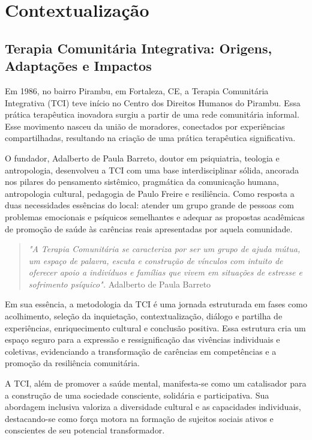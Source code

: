 \part{Contextualização}

    \chapter{Terapia Comunitária Integrativa: Origens, Adaptações e Impactos}
        Em 1986, no bairro Pirambu, em Fortaleza, CE, a Terapia Comunitária Integrativa (TCI) teve início no Centro dos Direitos Humanos do Pirambu. Essa prática terapêutica inovadora surgiu a partir de uma rede comunitária informal. Esse movimento nasceu da união de moradores, conectados por experiências compartilhadas, resultando na criação de uma prática terapêutica significativa. 
        
        O fundador, Adalberto de Paula Barreto, doutor em psiquiatria, teologia e antropologia, desenvolveu a TCI com uma base interdisciplinar sólida, ancorada nos pilares do pensamento sistêmico, pragmática da comunicação humana, antropologia cultural, pedagogia de Paulo Freire e resiliência. Como resposta a duas necessidades essências do local: atender um grupo grande de pessoas com problemas emocionais e psíquicos semelhantes e adequar as propostas acadêmicas de promoção de saúde às carências reais apresentadas por aquela comunidade.\cite{BARRETO}
        
            \begin{quote}
            
            \textit{"A Terapia Comunitária se caracteriza por ser um grupo de ajuda mútua, um espaço de palavra, escuta e construção de vínculos com intuito de oferecer apoio a indivíduos e famílias que vivem em situações de estresse e sofrimento psíquico".}
            Adalberto de Paula Barreto
            \end{quote}
        
        Em sua essência, a metodologia da TCI  é uma jornada estruturada em fases como acolhimento, seleção da inquietação, contextualização, diálogo e partilha de experiências, enriquecimento cultural e conclusão positiva. Essa estrutura cria um espaço seguro para a expressão e ressignificação das vivências individuais e coletivas, evidenciando a transformação de carências em competências e a promoção da resiliência comunitária.\cite{SILVA}
        
        A TCI, além de promover a saúde mental, manifesta-se como um catalisador para a construção de uma sociedade consciente, solidária e participativa. Sua abordagem inclusiva valoriza a diversidade cultural e as capacidades individuais, destacando-se como força motora na formação de sujeitos sociais ativos e conscientes de seu potencial transformador.\cite{BARRETO}
        
